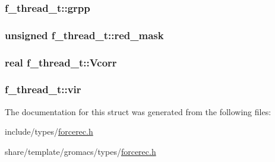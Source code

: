 \hypertarget{structf__thread__t_a75aba2073ad9a7bd42459b4c27f62fcd}{
\subsubsection[{grpp}]{ {\bf f\-\_\-thread\-\_\-t\-::grpp}}}\label{structf__thread__t_a75aba2073ad9a7bd42459b4c27f62fcd}
\hypertarget{structf__thread__t_a1dbb2e55d6426c036abe4e58297d87fd}{
\subsubsection[{red\-\_\-mask}]{\setlength{\rightskip}{0pt plus 5cm}unsigned {\bf f\-\_\-thread\-\_\-t\-::red\-\_\-mask}}}\label{structf__thread__t_a1dbb2e55d6426c036abe4e58297d87fd}
\hypertarget{structf__thread__t_afe5c7188b9865dd35e27725943f9217f}{
\subsubsection[{\-Vcorr}]{\setlength{\rightskip}{0pt plus 5cm}real {\bf f\-\_\-thread\-\_\-t\-::\-Vcorr}}}\label{structf__thread__t_afe5c7188b9865dd35e27725943f9217f}
\hypertarget{structf__thread__t_af2aab931e68bf9bc089289ba4bfe5609}{
\subsubsection[{vir}]{ {\bf f\-\_\-thread\-\_\-t\-::vir}}}\label{structf__thread__t_af2aab931e68bf9bc089289ba4bfe5609}


\-The documentation for this struct was generated from the following files\-:\begin{DoxyCompactItemize}
\item 
include/types/\hyperlink{include_2types_2forcerec_8h}{forcerec.\-h}\item 
share/template/gromacs/types/\hyperlink{share_2template_2gromacs_2types_2forcerec_8h}{forcerec.\-h}\end{DoxyCompactItemize}
